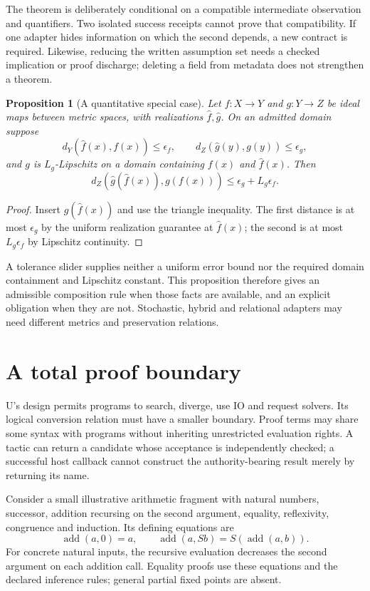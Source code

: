 \documentclass[11pt]{article}
\newtheorem{proposition}[definition]{Proposition}
\theoremstyle{remark}
\begin{document}
The theorem is deliberately conditional on a compatible intermediate
observation and quantifiers. Two isolated success receipts cannot prove
that compatibility. If one adapter hides information on which the second
depends, a new contract is required. Likewise, reducing the written
assumption set needs a checked implication or proof discharge; deleting a
field from metadata does not strengthen a theorem.

\begin{proposition}[A quantitative special case]
Let $f:X\to Y$ and $g:Y\to Z$ be ideal maps between metric spaces, with
realizations $\hat f,\hat g$. On an admitted domain suppose
\[
 d_Y(\hat f(x),f(x))\le\epsilon_f,\qquad
 d_Z(\hat g(y),g(y))\le\epsilon_g,
\]
and $g$ is $L_g$-Lipschitz on a domain containing $f(x)$ and $\hat f(x)$.
Then
\[
 d_Z(\hat g(\hat f(x)),g(f(x)))
 \le \epsilon_g+L_g\epsilon_f.
\]
\end{proposition}
\begin{proof}
Insert $g(\hat f(x))$ and use the triangle inequality. The first distance
is at most $\epsilon_g$ by the uniform realization guarantee at
$\hat f(x)$; the second is at most $L_g\epsilon_f$ by Lipschitz continuity.
\end{proof}

A tolerance slider supplies neither a uniform error bound nor the required
domain containment and Lipschitz constant. This proposition therefore gives
an admissible composition rule when those facts are available, and an
explicit obligation when they are not. Stochastic, hybrid and relational
adapters may need different metrics and preservation relations.

\section{A total proof boundary}
\label{sec:proof}

U's design permits programs to search, diverge, use IO and request solvers.
Its logical conversion relation must have a smaller boundary. Proof terms
may share some syntax with programs without inheriting unrestricted
evaluation rights. A tactic can return a candidate whose acceptance is
independently checked; a successful host callback cannot construct the
authority-bearing result merely by returning its name.

Consider a small illustrative arithmetic fragment with natural numbers,
successor, addition recursing on the second argument, equality,
reflexivity, congruence and induction. Its defining equations are
\[
 \operatorname{add}(a,0)=a,\qquad
 \operatorname{add}(a,Sb)=S(\operatorname{add}(a,b)).
\]
For concrete natural inputs, the recursive evaluation decreases the second
argument on each addition call. Equality proofs use these equations and
the declared inference rules; general partial fixed points are absent.
\end{document}
